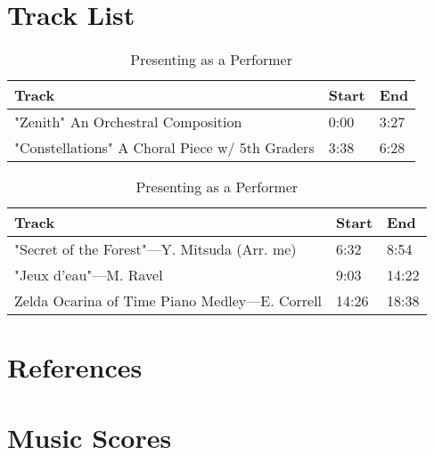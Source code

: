 \documentclass[12pt]{article}
\begin{document}
\section{Track List}

\begin{table}[H]
\centering
\begin{tabularx}{0.9\textwidth}{@{}lX@{}X@{}}
\toprule
\textbf{Track} & \textbf{Start} & \textbf{End} \\ \midrule
"Zenith" An Orchestral Composition & 0:00 & 3:27 \\
"Constellations" A Choral Piece w/ 5th Graders & 3:38 & 6:28 \\ \bottomrule
\end{tabularx}
\caption{Presenting as a Creator}
\vspace*{0.5cm}
\begin{tabularx}{0.9\textwidth}{@{}lX@{}X@{}}
\toprule
\textbf{Track} & \textbf{Start} & \textbf{End} \\ \midrule
"Secret of the Forest"—Y. Mitsuda (Arr. me) & 6:32 & 8:54 \\
"Jeux d'eau"—M. Ravel & 9:03 & 14:22 \\
Zelda Ocarina of Time Piano Medley—E. Correll & 14:26 & 18:38 \\ \bottomrule
\end{tabularx}
\caption{Presenting as a Performer}
\end{table}


\section{References}
\printbibliography[heading=none]

\section{Music Scores}


\end{document}
